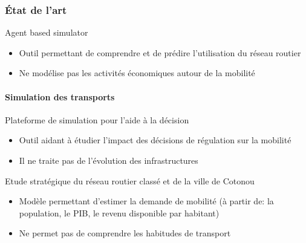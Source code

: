 %

\begin{frame}
    \frametitle{État de l'art}
    \begin{block}{Agent based simulator~\parencite{zargayouna2013agent}}
        \begin{itemize}
            \item {} Outil permettant de comprendre et de prédire l'utilisation du réseau routier
            \item {} Ne modélise pas les activités économiques autour de la mobilité
        \end{itemize}
    \end{block}
    \framesubtitle{Simulation des transports}
    \begin{block}{Plateforme de simulation pour l'aide à la décision~\parencite{nguyen2015plate}}
        \begin{itemize}
            \item {} Outil aidant à étudier l'impact des décisions de régulation sur la mobilité
            \item {} Il ne traite pas de l'évolution des infrastructures
        \end{itemize}
    \end{block}
    \begin{block}{Etude stratégique du réseau routier classé et de la ville de Cotonou~\parencite{louisberger2017etudes}}
        \begin{itemize}
            \item {} Modèle permettant d'estimer la demande de mobilité (à partir de: la population, le PIB, le revenu disponible par habitant)
            \item {} Ne permet pas de comprendre les habitudes de transport
        \end{itemize}
    \end{block}
\end{frame}

